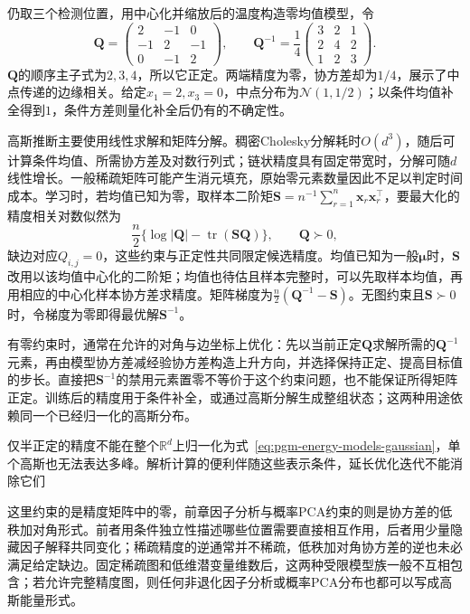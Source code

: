仍取三个检测位置，用中心化并缩放后的温度构造零均值模型，令
\[
  \bm{Q}=
  \begin{pmatrix}
    2&-1&0\\ -1&2&-1\\ 0&-1&2
  \end{pmatrix},
  \qquad
  \bm{Q}^{-1}=\frac14
  \begin{pmatrix}
    3&2&1\\ 2&4&2\\ 1&2&3
  \end{pmatrix}.
\]
$\bm{Q}$的顺序主子式为$2,3,4$，所以它正定。两端精度为零，协方差却为$1/4$，展示了中点传递的边缘相关。给定$x_1=2,x_3=0$，中点分布为$\mathcal{N}(1,1/2)$；以条件均值补全得到$1$，条件方差则量化补全后仍有的不确定性。

高斯推断主要使用线性求解和矩阵分解。稠密Cholesky分解耗时$O(d^3)$，随后可计算条件均值、所需协方差及对数行列式；链状精度具有固定带宽时，分解可随$d$线性增长。一般稀疏矩阵可能产生消元填充，原始零元素数量因此不足以判定时间成本。学习时，若均值已知为零，取样本二阶矩$\bm{S}=n^{-1}\sum_{r=1}^n\bm{x}_r\bm{x}_r^\top$，要最大化的精度相关对数似然为
\[
  \frac n2\{\log|\bm{Q}|-\operatorname{tr}(\bm{S}\bm{Q})\},
  \qquad \bm{Q}\succ0,
\]
缺边对应$Q_{i,j}=0$，这些约束与正定性共同限定候选精度。均值已知为一般$\bm{\mu}$时，$\bm{S}$改用以该均值中心化的二阶矩；均值也待估且样本完整时，可以先取样本均值，再用相应的中心化样本协方差求精度。矩阵梯度为$\frac n2(\bm{Q}^{-1}-\bm{S})$。无图约束且$\bm{S}\succ0$时，令梯度为零即得最优解$\bm{S}^{-1}$。

有零约束时，通常在允许的对角与边坐标上优化：先以当前正定$\bm{Q}$求解所需的$\bm{Q}^{-1}$元素，再由模型协方差减经验协方差构造上升方向，并选择保持正定、提高目标值的步长。直接把$\bm{S}^{-1}$的禁用元素置零不等价于这个约束问题，也不能保证所得矩阵正定。训练后的精度用于条件补全，或通过高斯分解生成整组状态；这两种用途依赖同一个已经归一化的高斯分布。

仅半正定的精度不能在整个$\mathbb{R}^d$上归一化为式~\eqref{eq:pgm-energy-models-gaussian}，单个高斯也无法表达多峰。解析计算的便利伴随这些表示条件，延长优化迭代不能消除它们

这里约束的是精度矩阵中的零，前章因子分析与概率PCA约束的则是协方差的低秩加对角形式。前者用条件独立性描述哪些位置需要直接相互作用，后者用少量隐藏因子解释共同变化；稀疏精度的逆通常并不稀疏，低秩加对角协方差的逆也未必满足给定缺边。固定稀疏图和低维潜变量维数后，这两种受限模型族一般不互相包含；若允许完整精度图，则任何非退化因子分析或概率PCA分布也都可以写成高斯能量形式。

